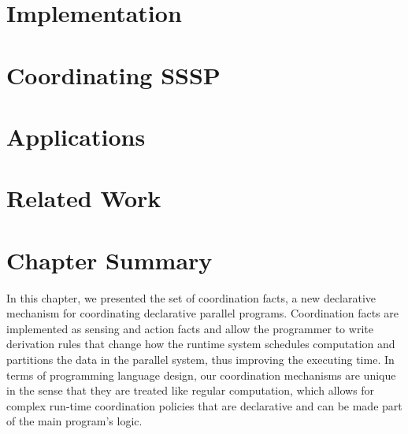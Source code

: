 \section{Implementation}


\section{Coordinating SSSP}


\section{Applications}



\section{Related Work}\label{sec:coordination:related}

\section{Chapter Summary}

In this chapter, we presented the set of coordination facts, a new declarative
mechanism for coordinating declarative parallel programs. Coordination facts are
implemented as sensing and action facts and allow the programmer to write
derivation rules that change how the runtime system schedules computation and
partitions the data in the parallel system, thus improving the executing time.
In terms of programming language design, our coordination mechanisms are unique
in the sense that they are treated like regular computation, which allows for
complex run-time coordination policies that are declarative and can be made part
of the main program's logic.
